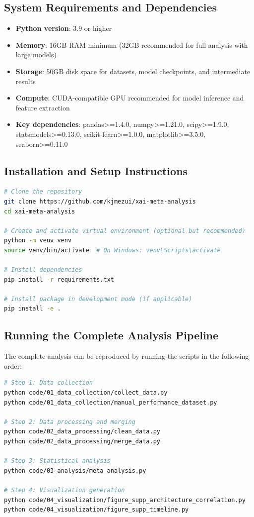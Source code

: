 \documentclass[preprint,12pt]{elsarticle}
\begin{document}
\subsection{System Requirements and Dependencies}
\begin{itemize}
    \item \textbf{Python version}: 3.9 or higher
    \item \textbf{Memory}: 16GB RAM minimum (32GB recommended for full analysis with large models)
    \item \textbf{Storage}: 50GB disk space for datasets, model checkpoints, and intermediate results
    \item \textbf{Compute}: CUDA-compatible GPU recommended for model inference and feature extraction
    \item \textbf{Key dependencies}: pandas>=1.4.0, numpy>=1.21.0, scipy>=1.9.0, statsmodels>=0.13.0, scikit-learn>=1.0.0, matplotlib>=3.5.0, seaborn>=0.11.0
\end{itemize}

\subsection{Installation and Setup Instructions}
\begin{lstlisting}[language=bash]
# Clone the repository
git clone https://github.com/kjmezui/xai-meta-analysis
cd xai-meta-analysis

# Create and activate virtual environment (optional but recommended)
python -m venv venv
source venv/bin/activate  # On Windows: venv\Scripts\activate

# Install dependencies
pip install -r requirements.txt

# Install package in development mode (if applicable)
pip install -e .
\end{lstlisting}

\subsection{Running the Complete Analysis Pipeline}
The complete analysis can be reproduced by running the scripts in the following order:
\begin{lstlisting}[language=bash]
# Step 1: Data collection
python code/01_data_collection/collect_data.py
python code/01_data_collection/manual_performance_dataset.py

# Step 2: Data processing and merging
python code/02_data_processing/clean_data.py
python code/02_data_processing/merge_data.py

# Step 3: Statistical analysis
python code/03_analysis/meta_analysis.py

# Step 4: Visualization generation
python code/04_visualization/figure_supp_architecture_correlation.py
python code/04_visualization/figure_supp_timeline.py
\end{lstlisting}
\end{document}
